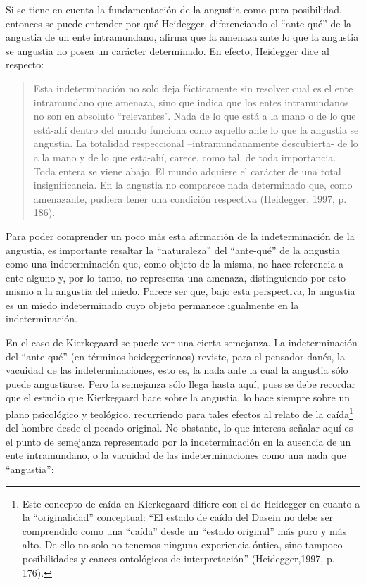 \begin{refsection}
Si se tiene en cuenta la fundamentación de la angustia como pura posibilidad, entonces se puede entender por qué Heidegger, diferenciando el ``ante-qué'' de la angustia de un ente intramundano, afirma que la amenaza ante lo que la angustia se angustia no posea un carácter determinado. En efecto, Heidegger dice al respecto:

\begin{quote}
Esta indeterminación no solo deja fácticamente sin resolver cual es el ente intramundano que amenaza, sino que indica que los entes intramundanos no son en absoluto ``relevantes''. Nada de lo que está a la mano o de lo que está-ahí dentro del mundo funciona como aquello ante lo que la angustia se angustia. La totalidad respeccional --intramundanamente descubierta- de lo a la mano y de lo que esta-ahí, carece, como tal, de toda importancia. Toda entera se viene abajo. El mundo adquiere el carácter de una total insignificancia. En la angustia no comparece nada determinado que, como amenazante, pudiera tener una condición respectiva (Heidegger, 1997, p. 186).
\end{quote}

Para poder comprender un poco más esta afirmación de la indeterminación de la angustia, es importante resaltar la ``naturaleza'' del ``ante-qué'' de la angustia como una indeterminación que, como objeto de la misma, no hace referencia a ente alguno y, por lo tanto, no representa una amenaza, distinguiendo por esto mismo a la angustia del miedo. Parece ser que, bajo esta perspectiva, la angustia es un miedo indeterminado cuyo objeto permanece igualmente en la indeterminación.

En el caso de Kierkegaard se puede ver una cierta semejanza. La indeterminación del ``ante-qué'' (en términos heideggerianos) reviste, para el pensador danés, la vacuidad de las indeterminaciones, esto es, la nada ante la cual la angustia sólo puede angustiarse. Pero la semejanza sólo llega hasta aquí, pues se debe recordar que el estudio que Kierkegaard hace sobre la angustia, lo hace siempre sobre un plano psicológico y teológico, recurriendo para tales efectos al relato de la caída\footnote{Este concepto de caída en Kierkegaard difiere con el de Heidegger en cuanto a la ``originalidad'' conceptual: ``El estado de caída del Dasein no debe ser comprendido como una ``caída'' desde un ``estado original'' más puro y más alto. De ello no solo no tenemos ninguna experiencia óntica, sino tampoco posibilidades y cauces ontológicos de interpretación'' (Heidegger,1997, p. 176).} del hombre desde el pecado original. No obstante, lo que interesa señalar aquí es el punto de semejanza representado por la indeterminación en la ausencia de un ente intramundano, o la vacuidad de las indeterminaciones como una nada que ``angustia'':


\end{refsection}
